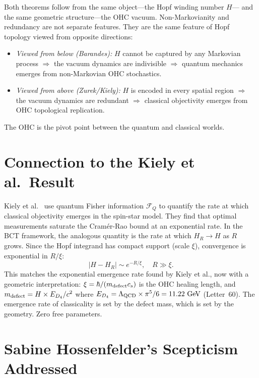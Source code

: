 \documentclass[aps,prl,preprint,superscriptaddress,floatfix]{revtex4-2}
\begin{document}
Both theorems follow from the same object---the Hopf winding number $H$---
and the same geometric structure---the OHC vacuum. Non-Markovianity and
redundancy are not separate features. They are the same feature of Hopf
topology viewed from opposite directions:

\begin{itemize}
\item \textit{Viewed from below (Barandes):} $H$ cannot be captured by any
Markovian process $\Rightarrow$ the vacuum dynamics are indivisible
$\Rightarrow$ quantum mechanics emerges from non-Markovian OHC stochastics.
\item \textit{Viewed from above (Zurek/Kiely):} $H$ is encoded in every
spatial region $\Rightarrow$ the vacuum dynamics are redundant
$\Rightarrow$ classical objectivity emerges from OHC topological replication.
\end{itemize}

The OHC is the pivot point between the quantum and classical worlds.

\section{Connection to the Kiely et al.\ Result}

Kiely et al.~\cite{kiely2026} use quantum Fisher information $\mathcal{F}_Q$
to quantify the rate at which classical objectivity emerges in the spin-star
model. They find that optimal measurements saturate the Cram\'er-Rao bound
at an exponential rate. In the BCT framework, the analogous quantity is the
rate at which $H_R\to H$ as $R$ grows. Since the Hopf integrand has compact
support (scale $\xi$), convergence is exponential in $R/\xi$:
\begin{equation}
|H - H_R| \sim e^{-R/\xi},\quad R\gg\xi.
\end{equation}
This matches the exponential emergence rate found by Kiely et al., now
with a geometric interpretation: $\xi = \hbar/(m_{\rm defect}c_s)$ is
the OHC healing length, and $m_{\rm defect} = H\times E_{D_4}/c^2$
where $E_{D_4} = \Lambda_{\rm QCD}\times\pi^5/6 = 11.22~\text{GeV}$
(Letter~60). The emergence rate of classicality is set by the defect mass,
which is set by the geometry. Zero free parameters.

\section{Sabine Hossenfelder's Scepticism Addressed}
\end{document}
